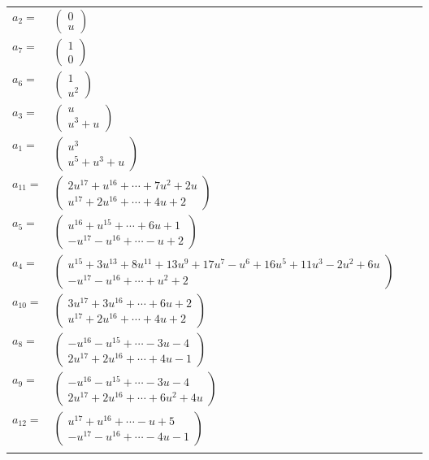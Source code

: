 \documentclass[1p]{elsarticle_modified}
\theoremstyle{definition}
\begin{document}
\begin{tabular}{m{7pt} m{180pt} m{7pt} m{180pt} }
\flushright $a_{2}=$&$\begin{pmatrix}0\\u\end{pmatrix}$ \\
\flushright $a_{7}=$&$\begin{pmatrix}1\\0\end{pmatrix}$ \\
\flushright $a_{6}=$&$\begin{pmatrix}1\\u^2\end{pmatrix}$ \\
\flushright $a_{3}=$&$\begin{pmatrix}u\\u^3+u\end{pmatrix}$ \\
\flushright $a_{1}=$&$\begin{pmatrix}u^3\\u^5+u^3+u\end{pmatrix}$ \\
\flushright $a_{11}=$&$\begin{pmatrix}2 u^{17}+u^{16}+\cdots+7 u^2+2 u\\u^{17}+2 u^{16}+\cdots+4 u+2\end{pmatrix}$ \\
\flushright $a_{5}=$&$\begin{pmatrix}u^{16}+u^{15}+\cdots+6 u+1\\- u^{17}- u^{16}+\cdots- u+2\end{pmatrix}$ \\
\flushright $a_{4}=$&$\begin{pmatrix}u^{15}+3 u^{13}+8 u^{11}+13 u^9+17 u^7- u^6+16 u^5+11 u^3-2 u^2+6 u\\- u^{17}- u^{16}+\cdots+u^2+2\end{pmatrix}$ \\
\flushright $a_{10}=$&$\begin{pmatrix}3 u^{17}+3 u^{16}+\cdots+6 u+2\\u^{17}+2 u^{16}+\cdots+4 u+2\end{pmatrix}$ \\
\flushright $a_{8}=$&$\begin{pmatrix}- u^{16}- u^{15}+\cdots-3 u-4\\2 u^{17}+2 u^{16}+\cdots+4 u-1\end{pmatrix}$ \\
\flushright $a_{9}=$&$\begin{pmatrix}- u^{16}- u^{15}+\cdots-3 u-4\\2 u^{17}+2 u^{16}+\cdots+6 u^2+4 u\end{pmatrix}$ \\
\flushright $a_{12}=$&$\begin{pmatrix}u^{17}+u^{16}+\cdots- u+5\\- u^{17}- u^{16}+\cdots-4 u-1\end{pmatrix}$\\&\end{tabular}
\end{document}
